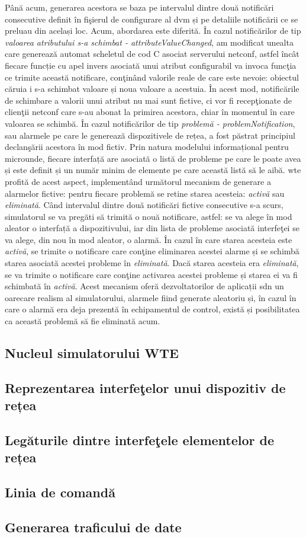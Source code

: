 Până acum, generarea acestora se baza pe intervalul dintre două notificări consecutive definit în fişierul de configurare al \gls{dvm} și pe detaliile notificării ce se preluau din același loc. Acum, abordarea este diferită. În cazul notificărilor de tip \textit{valoarea atributului s-a schimbat - attributeValueChanged}, am modificat unealta care generează automat scheletul de cod C asociat serverului \gls{netconf}, astfel încât fiecare funcție cu apel invers asociată unui atribut configurabil va invoca funcţia ce trimite această notificare, conţinând valorile reale de care este nevoie: obiectul căruia i s-a schimbat valoare și noua valoare a acestuia. În acest mod, notificările de schimbare a valorii unui atribut nu mai sunt fictive, ci vor fi recepţionate de clienţii \gls{netconf} care s-au abonat la primirea acestora, chiar în momentul în care valoarea se schimbă. În cazul notificărilor de tip \textit{problemă - problemNotification}, sau alarmele pe care le generează dispozitivele de rețea, a fost păstrat principiul declanşării acestora în mod fictiv. Prin natura modelului informațional pentru microunde, fiecare interfață are asociată o listă de probleme pe care le poate avea și este definit și un număr minim de elemente pe care această listă să le aibă. \gls{wte} profită de acest aspect, implementând următorul mecanism de generare a alarmelor fictive: pentru fiecare problemă se retine starea acesteia: \textit{activă} sau \textit{eliminată}. Când intervalul dintre două notificări fictive consecutive s-a scurs, simulatorul se va pregăti să trimită o nouă notificare, astfel: se va alege în mod aleator o interfață a dispozitivului, iar din lista de probleme asociată interfeţei se va alege, din nou în mod aleator, o alarmă. În cazul în care starea acesteia este \textit{activă}, se trimite o notificare care conţine eliminarea acestei alarme și se schimbă starea asociată acestei probleme în \textit{eliminată}. Dacă starea acesteia era \textit{eliminată}, se va trimite o notificare care conţine activarea acestei probleme și starea ei va fi schimbată în \textit{activă}. Acest mecanism oferă dezvoltatorilor de aplicații \gls{sdn} un oarecare realism al simulatorului, alarmele fiind generate aleatoriu și, în cazul în care o alarmă era deja prezentă în echipamentul de control, există și posibilitatea ca această problemă să fie eliminată acum.

\subsection{Nucleul simulatorului WTE}



\subsection{Reprezentarea interfeţelor unui dispozitiv de rețea}

\subsection{Legăturile dintre interfeţele elementelor de rețea}

\subsection{Linia de comandă}

\subsection{Generarea traficului de date}